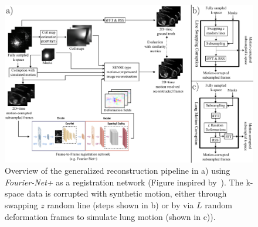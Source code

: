 \begin{figure}[h] %
	\centering
	\includegraphics[width=\textwidth]{./Images/GeneralReconstructionPipeline.pdf} 
	\caption{Overview of the generalized reconstruction pipeline in a) using \emph{Fourier-Net+} as a registration network (Figure inspired by~\cite{Kuestner2022}). The k-space data is corrupted with synthetic motion, either through swapping $z$ random line (steps shown in b) or by via $L$ random deformation frames to simulate lung motion (shown in c)).}
	\label{fig:GeneralReconstructionPipeline}
\end{figure}
